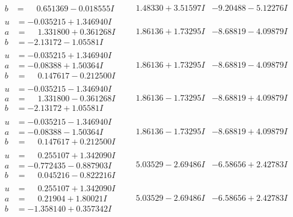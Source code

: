 \documentclass[1p]{elsarticle_modified}
\theoremstyle{definition}
\begin{document}
$$\begin{array}{c|c|c}
\begin{aligned}
b &= \phantom{-}0.651369 - 0.018555 I\end{aligned}
 & \phantom{-}1.48330 + 3.51597 I & -9.20488 - 5.12276 I \\ \hline\begin{aligned}
u &= -0.035215 + 1.346940 I \\
a &= \phantom{-}1.331800 + 0.361268 I \\
b &= -2.13172 - 1.05581 I\end{aligned}
 & \phantom{-}1.86136 + 1.73295 I & -8.68819 - 4.09879 I \\ \hline\begin{aligned}
u &= -0.035215 + 1.346940 I \\
a &= -0.08388 + 1.50364 I \\
b &= \phantom{-}0.147617 - 0.212500 I\end{aligned}
 & \phantom{-}1.86136 + 1.73295 I & -8.68819 - 4.09879 I \\ \hline\begin{aligned}
u &= -0.035215 - 1.346940 I \\
a &= \phantom{-}1.331800 - 0.361268 I \\
b &= -2.13172 + 1.05581 I\end{aligned}
 & \phantom{-}1.86136 - 1.73295 I & -8.68819 + 4.09879 I \\ \hline\begin{aligned}
u &= -0.035215 - 1.346940 I \\
a &= -0.08388 - 1.50364 I \\
b &= \phantom{-}0.147617 + 0.212500 I\end{aligned}
 & \phantom{-}1.86136 - 1.73295 I & -8.68819 + 4.09879 I \\ \hline\begin{aligned}
u &= \phantom{-}0.255107 + 1.342090 I \\
a &= -0.772435 - 0.887903 I \\
b &= \phantom{-}0.045216 - 0.822216 I\end{aligned}
 & \phantom{-}5.03529 - 2.69486 I & -6.58656 + 2.42783 I \\ \hline\begin{aligned}
u &= \phantom{-}0.255107 + 1.342090 I \\
a &= \phantom{-}0.21904 + 1.80021 I \\
b &= -1.358140 + 0.357342 I\end{aligned}
 & \phantom{-}5.03529 - 2.69486 I & -6.58656 + 2.42783 I \\ \hline\begin{aligned}

\end{aligned}
\end{array}$$
\end{document}
